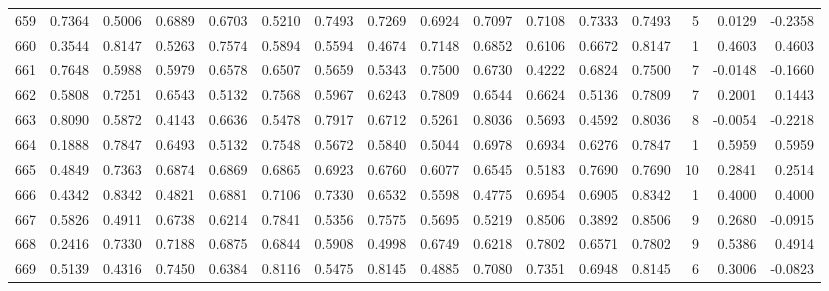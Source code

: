 \begin{tabular}{lrrrrrrrrrrrrrrr}
659 &      0.7364 &  0.5006 &  0.6889 &  0.6703 &  0.5210 &  0.7493 &  0.7269 &  0.6924 &  0.7097 &  0.7108 &   0.7333 &     0.7493 &      5 &                    0.0129 &                    -0.2358 \\
660 &      0.3544 &  0.8147 &  0.5263 &  0.7574 &  0.5894 &  0.5594 &  0.4674 &  0.7148 &  0.6852 &  0.6106 &   0.6672 &     0.8147 &      1 &                    0.4603 &                     0.4603 \\
661 &      0.7648 &  0.5988 &  0.5979 &  0.6578 &  0.6507 &  0.5659 &  0.5343 &  0.7500 &  0.6730 &  0.4222 &   0.6824 &     0.7500 &      7 &                   -0.0148 &                    -0.1660 \\
662 &      0.5808 &  0.7251 &  0.6543 &  0.5132 &  0.7568 &  0.5967 &  0.6243 &  0.7809 &  0.6544 &  0.6624 &   0.5136 &     0.7809 &      7 &                    0.2001 &                     0.1443 \\
663 &      0.8090 &  0.5872 &  0.4143 &  0.6636 &  0.5478 &  0.7917 &  0.6712 &  0.5261 &  0.8036 &  0.5693 &   0.4592 &     0.8036 &      8 &                   -0.0054 &                    -0.2218 \\
664 &      0.1888 &  0.7847 &  0.6493 &  0.5132 &  0.7548 &  0.5672 &  0.5840 &  0.5044 &  0.6978 &  0.6934 &   0.6276 &     0.7847 &      1 &                    0.5959 &                     0.5959 \\
665 &      0.4849 &  0.7363 &  0.6874 &  0.6869 &  0.6865 &  0.6923 &  0.6760 &  0.6077 &  0.6545 &  0.5183 &   0.7690 &     0.7690 &     10 &                    0.2841 &                     0.2514 \\
666 &      0.4342 &  0.8342 &  0.4821 &  0.6881 &  0.7106 &  0.7330 &  0.6532 &  0.5598 &  0.4775 &  0.6954 &   0.6905 &     0.8342 &      1 &                    0.4000 &                     0.4000 \\
667 &      0.5826 &  0.4911 &  0.6738 &  0.6214 &  0.7841 &  0.5356 &  0.7575 &  0.5695 &  0.5219 &  0.8506 &   0.3892 &     0.8506 &      9 &                    0.2680 &                    -0.0915 \\
668 &      0.2416 &  0.7330 &  0.7188 &  0.6875 &  0.6844 &  0.5908 &  0.4998 &  0.6749 &  0.6218 &  0.7802 &   0.6571 &     0.7802 &      9 &                    0.5386 &                     0.4914 \\
669 &      0.5139 &  0.4316 &  0.7450 &  0.6384 &  0.8116 &  0.5475 &  0.8145 &  0.4885 &  0.7080 &  0.7351 &   0.6948 &     0.8145 &      6 &                    0.3006 &                    -0.0823 \\

\end{tabular}
